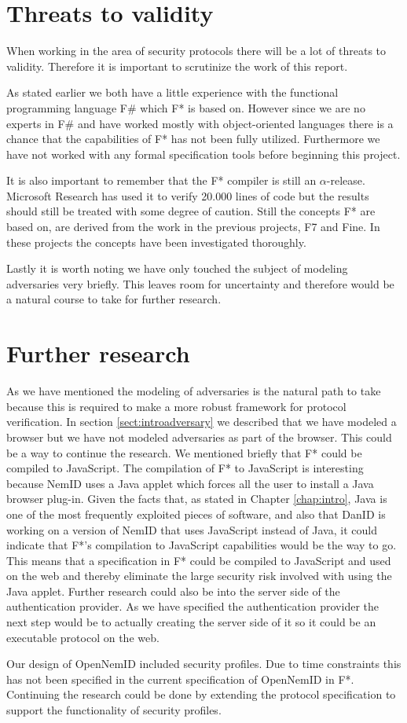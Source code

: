 \documentclass[twosided]{report}
\begin{document}
\section{Threats to validity}
When working in the area of security protocols there will be a lot of threats to validity. Therefore it is important to scrutinize the work of this report.
\par
As stated earlier we both have a little experience with the functional programming language F\# which F* is based on. However since we are no experts in F\# and have worked mostly with object-oriented languages there is a chance that the capabilities of F* has not been fully utilized. Furthermore we have not worked with any formal specification tools before beginning this project.
\par
It is also important to remember that the F* compiler is still an $\alpha$-release. Microsoft Research has used it to verify 20.000 lines of code \cite{fstar-msr} but the results should still be treated with some degree of caution. Still the concepts F* are based on, are derived from the work in the previous projects, F7 and Fine. In these projects the concepts have been investigated thoroughly.
\par
Lastly it is worth noting we have only touched the subject of modeling adversaries very briefly. This leaves room for uncertainty and therefore would be a natural course to take for further research.

\section{Further research}
As we have mentioned the modeling of adversaries is the natural path to take because this is required to make a more robust framework for protocol verification. In section \ref{sect:introadversary} we described that we have modeled a browser but we have not modeled adversaries as part of the browser. This could be a way to continue the research. We mentioned briefly that F* could be compiled to JavaScript. The compilation of F* to JavaScript is interesting because NemID uses a Java applet which forces all the user to install a Java browser plug-in. Given the facts that, as stated in Chapter \ref{chap:intro}, Java is one of the most frequently exploited pieces of software, and also that DanID is working on a version of NemID that uses JavaScript instead of Java, it could indicate that F*'s compilation to JavaScript capabilities would be the way to go. This means that a specification in F* could be compiled to JavaScript and used on the web and thereby eliminate the large security risk involved with using the Java applet. Further research could also be into the server side of the authentication provider. As we have specified the authentication provider the next step would be to actually creating the server side of it so it could be an executable protocol on the web.
\par
Our design of OpenNemID included security profiles. Due to time constraints this has not been specified in the current specification of OpenNemID in F*. Continuing the research could be done by extending the protocol specification to support the functionality of security profiles.
\end{document}
